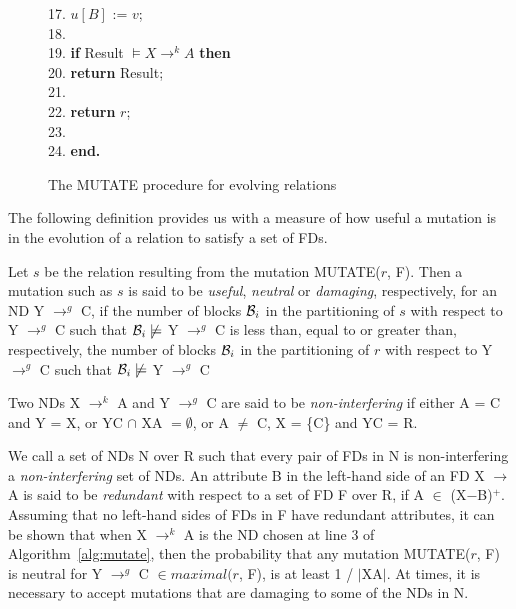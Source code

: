 {\begin{figure}[ht]
\begin{center}
{\begin{minipage}{11cm}
\begin{algorithm}[{\rm MUTATE}($r$, {\rm F})]
\begin{rm}
\begin{tabbing}
17.\> \> \> \> $u[B]$ := $v$;\\
18. \> \>  \\
19. \> \> \> {\bf if} Result $ \models  X \to^k A $ {\bf then}\\
20.  \> \> \>\> {\bf return} Result;\\
21. \> \> \\
22. \> \> \>\> {\bf return} $r$;\\
23. \> \> \\
24.  \>  \> {\bf end. }
\end{tabbing}
\end{rm}
\end{algorithm}
\end{minipage}}
\end{center}
\caption{\label{numdep:fig:mutate} The MUTATE procedure for evolving relations}
\end{figure}
}
\medskip
The following definition provides us with a measure of how useful a mutation 
is in the evolution of a relation to satisfy a set of FDs.

\begin{definition}
\begin{rm}
Let $s$ be the relation resulting from the mutation MUTATE($r$, F).
Then a mutation such as $s$ is said to be {\em useful}, {\em neutral} or 
{\em damaging}, respectively, for an ND Y $\to^g$ C,
if the number of blocks ${\cal B}_i$
in the partitioning of $s$ with respect to Y $\to^g$ C
such that ${\cal B}_i \not\models$ Y $\to^g$ C
is less than, equal to or greater than, respectively, 
the number of blocks ${\cal B}_i$ 
in the partitioning of $r$ with respect to Y $\to^g$ C
such that ${\cal B}_i \not\models$ Y $\to^g$ C
\end{rm}
\end{definition}

\begin{definition}\label{def:nd_non-int}
\begin{rm}
Two NDs X $\to^k$ A and Y $\to^g$ C are said to be {\em non-interfering} if 
either A = C and Y = X, or YC $\cap$ XA $= \emptyset$, 
or A $\not=$ C, X = \{C\} and YC = R.
\end{rm}
\end{definition}
\medskip

We call a set of NDs N over R such that every pair of FDs in N is
non-interfering a {\em non-interfering} set of NDs.
An attribute B in the left-hand side of an FD X $\to$ A is said to be 
{\em redundant} with respect to a set of FD F over R, if A $\in$ (X$-$B)${}^+$.
Assuming that no left-hand sides of FDs in F have redundant attributes,
it can be shown that when X $\to^k$ A is the ND chosen at line 3 of 
Algorithm~\ref{alg:mutate}, then the probability that any mutation MUTATE($r$, F)
is neutral for Y $\to^g$ C $\in maximal(r$, F), is at least 1 / $\mid$XA$\mid$.
At times, it is necessary to accept mutations that are damaging 
to some of the NDs in N. 

